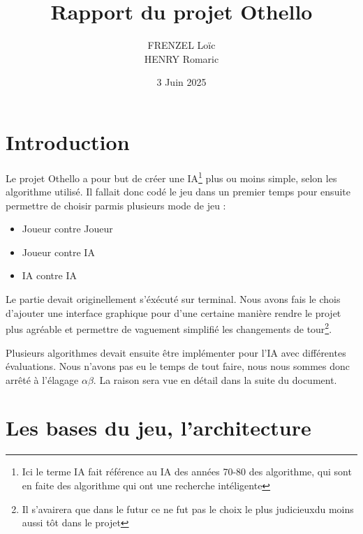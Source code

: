 \documentclass[12pt, legalpaper]{article}
\title{Rapport du projet Othello}
\author{FRENZEL Loïc\\HENRY Romaric}
\date{3 Juin 2025}
\begin{document}
\maketitle

\newpage

\tableofcontents

\newpage

\section{Introduction}

Le projet Othello a pour but de créer une IA\footnote{Ici le terme IA fait référence au IA 
des années 70-80 des algorithme, qui sont en faite des algorithme qui ont une recherche intéligente}
plus ou moins simple, selon les algorithme utilisé. Il fallait donc codé le jeu dans un premier temps
pour ensuite permettre de choisir parmis plusieurs mode de jeu :   
\begin{itemize}
    \item Joueur contre Joueur
    \item Joueur contre IA
    \item IA contre IA
\end{itemize}


Le partie devait originellement s'éxécuté sur terminal. Nous avons fais le chois d'ajouter une interface
graphique pour d'une certaine manière rendre le projet plus agréable et permettre de vaguement simplifié 
les changements de 
tour\footnote{Il s'avairera que dans le futur ce ne fut pas le choix le plus judicieuxdu moins aussi tôt dans le projet}.

Plusieurs algorithmes devait ensuite être implémenter pour l'IA avec différentes évaluations. 
Nous n'avons pas eu le temps de tout faire, nous nous sommes donc arrêté à l'élagage $\alpha$$\beta$.
La raison sera vue en détail dans la suite du document.

\newpage

\section{Les bases du jeu, l'architecture}
\end{document}
